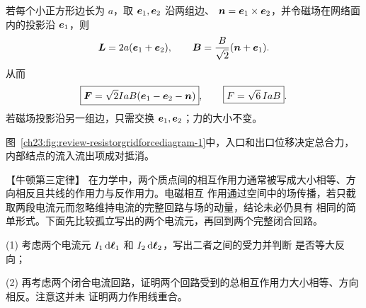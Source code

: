 {\begin{xesolution}
若每个小正方形边长为 $a$，取 $\bm{e}_1,\bm{e}_2$ 沿两组边、
$\bm{n}=\bm{e}_1\times\bm{e}_2$，并令磁场在网络面内的投影沿 $\bm{e}_1$，则
\[
  \bm{L}=2a(\bm{e}_1+\bm{e}_2),
  \qquad
  \bm{B}=\frac{B}{\sqrt2}(\bm{n}+\bm{e}_1).
\]
从而
\begin{equation}
  \boxed{\bm{F}=\sqrt2IaB(\bm{e}_1-\bm{e}_2-\bm{n})},
  \qquad
  \boxed{F=\sqrt6\,IaB}.
\end{equation}
若磁场投影沿另一组边，只需交换 $\bm{e}_1,\bm{e}_2$；力的大小不变。

图~\ref{ch23:fig:review-resistorgridforcediagram-1}中，入口和出口位移决定总合力，内部结点的流入流出项成对抵消。
\par\noindent\begin{minipage}{\linewidth}
\resistorGridForceDiagram
{}
\end{minipage}\par\medskip
\end{xesolution}



\begin{origexamplebox}{【牛顿第三定律】}\label{ch23:ex:s39-8-6}
在力学中，两个质点间的相互作用力通常被写成大小相等、方向相反且共线的作用力与反作用力。电磁相互
作用通过空间中的场传播，若只截取两段电流元而忽略维持电流的完整回路与场的动量，结论未必仍具有
相同的简单形式。下面先比较孤立写出的两个电流元，再回到两个完整闭合回路。

(1) 考虑两个电流元 $I_1\mathop{}\!\mathrm d\bm{\ell}_1$ 和 $I_2\mathop{}\!\mathrm d\bm{\ell}_2$，写出二者之间的受力并判断
是否等大反向；

(2) 再考虑两个闭合电流回路，证明两个回路受到的总相互作用力大小相等、方向相反。注意这并未
证明两力作用线重合。

%
\begin{center}\end{center}
\end{origexamplebox}

}
